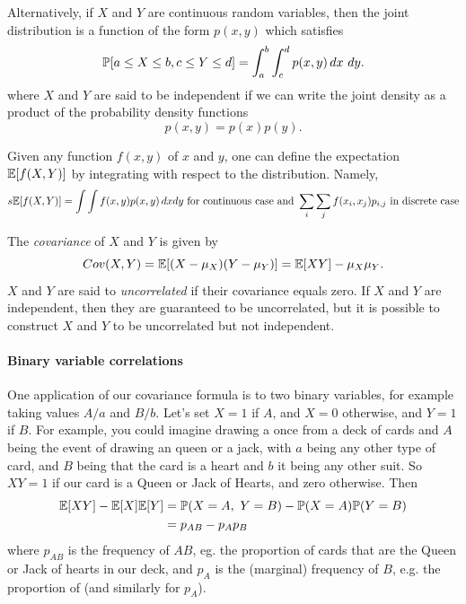 Alternatively, if $X$ and $Y$ are continuous random variables, then the joint distribution is a function of the form $p(x,y)$ which satisfies 
\begin{equation}
\P[a\le X\le b, c\le Y\le d]= \int_a^b \int_c^d p(x,y)\,dx~dy. 
\end{equation}
where $X$ and $Y$ are said to be independent if we can write the
joint density as a product of the probability density functions 
\begin{equation}
p(x,y) = p(x) p(y).
\end{equation}

Given any function $f(x,y)$ of $x$ and $y$, one can define the expectation $\E[f(X,Y)]$ by integrating with respect to the distribution. Namely, 
\begin{equation}s
\E[f(X,Y)]=\int \int f(x,y)p(x,y)\,dxdy \mbox{ for continuous case and } \sum_i \sum_j f(x_i,x_j) p_{i,j} \mbox{ in discrete case}
\end{equation}

The \emph{covariance} of  $X$ and $Y$ is given by 
\begin{equation}
Cov(X,Y) = \E[(X-\mu_X)(Y-\mu_Y)]=\E[XY]-\mu_X\mu_Y. \label{eqn:def_covar}
\end{equation}
$X$ and $Y$ are said to \emph{uncorrelated} if their covariance equals
zero. If $X$ and $Y$ are independent, then they are guaranteed to be
uncorrelated, but it is possible to construct $X$ and $Y$ to be
uncorrelated but not independent. 


\paragraph{Binary variable correlations}
One application of our covariance formula is to two binary variables,
for example taking values $A/a$ and $B/b$. Let's set $X=1$ if $A$, and
$X=0$ otherwise, and $Y=1$ if $B$.  For example, you could imagine drawing
a once from a deck of cards and $A$ being the event of drawing an
queen or a jack, with $a$ being any other type of card, and $B$ being that the card is
a heart and $b$ it being any other suit. So $XY=1$ if our card is a
Queen or Jack of Hearts, and zero otherwise. Then
\begin{align}
  \E[XY] - \E[X]\E[Y] &= \P(X=A,~Y=B) -  \P(X=A) \P(Y=B) \nonumber\\
                        & = p_{AB} - p_{A} p_{B} \label{eqn:binary_covar}
 \end{align}
where $p_{AB}$ is the frequency of $AB$, eg. the proportion of cards
that are the Queen or Jack of hearts in our deck, and $p_{A}$ is the
(marginal) frequency of $B$, e.g. the proportion of 
(and similarly for $p_{A}$).

